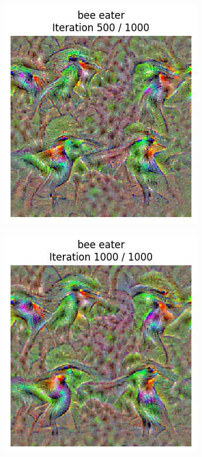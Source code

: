 \begin{figure}[H]
\begin{subfigure}[t]{.25\textwidth}
        \includegraphics[width=\linewidth]{figs_propre2/SqueezeNet/SqueezeNet_bird_animated_1000_blur_500_frame.png}
        \caption{}
        \label{fig:class_viz_iter:sub2}
    \end{subfigure}%
    \begin{subfigure}[t]{.25\textwidth}
        \centering
        \includegraphics[width=\linewidth]{figs_propre2/SqueezeNet/SqueezeNet_bird_animated_1000_blur_last_frame.png}

\end{subfigure}
\end{figure}
